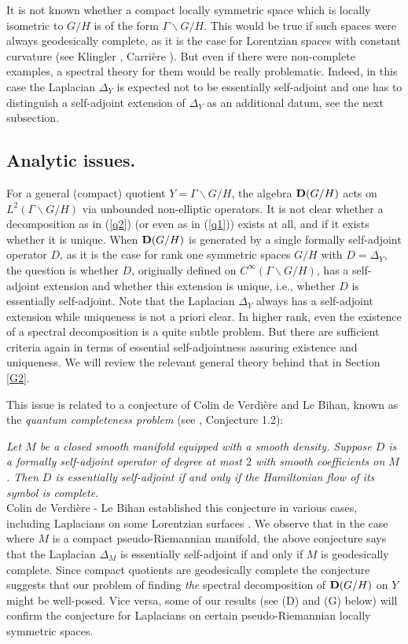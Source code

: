 \documentclass[10]{amsart}
\theoremstyle{remark}
\theoremstyle{definition}
\numberwithin{equation}{section}
\begin{document}
It is not known whether a compact locally symmetric space which is locally isometric to $G/H$ is of the form $\Gamma\backslash G/H$. This would be true if such spaces were always geodesically complete, as it is the case for Lorentzian spaces with constant curvature (see  Klingler \cite{Kli96}, Carri\`ere \cite{Car89}). But even if there were non-complete examples, a spectral theory for them would be really problematic. Indeed, in this case the Laplacian $\Delta_Y$ is expected not to be essentially self-adjoint and one has to distinguish a self-adjoint extension of $\Delta_Y$ as an additional datum, see the next subsection.

\subsection{Analytic issues.}\label{anal} For a general (compact) 
quotient $Y=\Gamma\backslash G/H$, the algebra ${\bf D}(G/H)$ acts on $L^2(\Gamma\backslash G/H)$ via unbounded 
non-elliptic 
operators. It is not clear whether a decomposition as in (\ref{q2}) (or even as in (\ref{q1})) exists at all, and if it exists whether it is unique. When ${\bf D}(G/H)$ is generated by a single formally self-adjoint operator $D$, as it is the case for rank one symmetric spaces $G/H$ with $D=\Delta_Y$, the question is whether $D$, originally defined on $C^\infty(\Gamma\backslash G/H)$, has a self-adjoint extension and whether this extension is unique, i.e., whether $D$ is essentially self-adjoint. Note that the Laplacian $\Delta_Y$ always has a self-adjoint extension while uniqueness
is not a priori clear. In higher rank, even the existence of a spectral decomposition is a quite subtle problem. But there are sufficient criteria again in terms of essential self-adjointness assuring existence and uniqueness. We will review the relevant general theory behind that in Section \ref{G2}.

This issue is related to a conjecture of Colin de Verdi\`ere and Le Bihan, known as the {\it quantum completeness problem} (see \cite{CL22}, Conjecture 1.2):
\vspace*{0.2cm}

%
{\it Let $M$ be a closed smooth manifold equipped with a smooth density. Suppose $D$ is a formally self-adjoint operator of degree at most $2$ with smooth coefficients on $M$. Then $D$ is essentially self-adjoint if and only if the Hamiltonian flow of its symbol is complete.}
%
\vspace*{0.2cm}\\
\noindent 
Colin de Verdi\`ere - Le Bihan established this conjecture in various cases, including Laplacians on some Lorentzian surfaces \cite{CL22}. We observe that in the case where $M$ is a compact  pseudo-Riemannian manifold, the above conjecture says that the Laplacian $\Delta_M$ is essentially self-adjoint if and only if $M$ is geodesically complete.
Since  compact quotients are geodesically complete the conjecture suggests that our problem of finding {\em the} spectral decomposition of ${\bf D}(G/H)$ on $Y$ might be well-posed.
Vice versa, some of our results (see (D) and ({G}) below) will confirm the conjecture for Laplacians on certain pseudo-Riemannian locally symmetric spaces.
\end{document}
